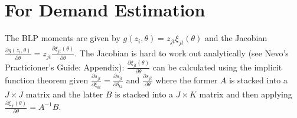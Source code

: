 \documentclass[a4paper]{article}
\begin{document}
\section*{\normalsize  For Demand Estimation}
The BLP moments are given by $g(z_i,\theta) = z_{jt} \xi_{jt}(\theta)$ and the Jacobian $\frac{\partial g(z_i,\theta)}{\partial \theta} = z_{jt}  \frac{\partial \xi_{jt}(\theta)}{\partial \theta}$. The Jacobian is hard to work out analytically (see Nevo's Practicioner's Guide: Appendix): $\frac{\partial \xi_{jt}(\theta)}{\partial \theta}$ can be calculated using the implicit function theorem given $\frac{\partial s_{jt}}{\partial \xi_{kt}}= \frac{\partial s_{jt}}{\partial \delta_{kt}}$ and $\frac{\partial s_{jt}}{\partial \theta}$ where the former $A$ is stacked into a $J \times J$ matrix and the latter $B$ is stacked into a $J \times K$ matrix and then applying $\frac{\partial \xi_{.t}(\theta)}{\partial \theta}=A^{-1} B$.
\end{document}
